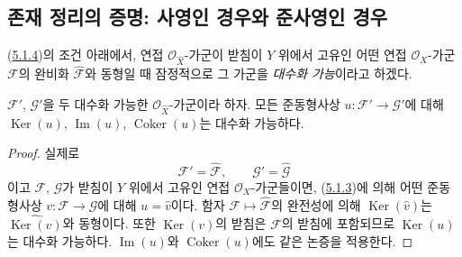 \subsection{존재 정리의 증명: 사영인 경우와 준사영인 경우}
\label{subsection:III.5.2-fr}

\begin{env}[5.2.1]
\label{III.5.2.1-fr}
(\hyperref[III.5.1.4-fr]{5.1.4})의 조건 아래에서, 연접
$\mathcal O_{\widehat X}$-가군이 받침이 $Y$ 위에서 고유인 어떤
연접 $\mathcal O_X$-가군 $\mathcal F$의 완비화
$\widehat{\mathcal F}$와 동형일 때 잠정적으로 그 가군을
\emph{대수화 가능}이라고 하겠다.
\end{env}

\begin{lemma}[5.2.2]
\label{III.5.2.2-fr}
$\mathcal F'$, $\mathcal G'$을 두 대수화 가능한
$\mathcal O_{\widehat X}$-가군이라 하자. 모든 준동형사상
$u:\mathcal F'\to\mathcal G'$에 대해
$\operatorname{Ker}(u)$, $\operatorname{Im}(u)$,
$\operatorname{Coker}(u)$는 대수화 가능하다.
\end{lemma}

\begin{proof}
실제로
\[
\mathcal F'=\widehat{\mathcal F},\qquad
\mathcal G'=\widehat{\mathcal G}
\]
이고 $\mathcal F$, $\mathcal G$가 받침이 $Y$ 위에서 고유인 연접
$\mathcal O_X$-가군들이면, (\hyperref[III.5.1.3-fr]{5.1.3})에
의해 어떤 준동형사상 $v:\mathcal F\to\mathcal G$에 대해
$u=\widehat v$이다. 함자
$\mathcal F\mapsto\widehat{\mathcal F}$의 완전성에 의해
$\operatorname{Ker}(\widehat v)$는
$\widehat{\operatorname{Ker}(v)}$와 동형이다. 또한
$\operatorname{Ker}(v)$의 받침은 $\mathcal F$의 받침에
포함되므로 $\operatorname{Ker}(u)$는 대수화 가능하다.
$\operatorname{Im}(u)$와 $\operatorname{Coker}(u)$에도 같은
논증을 적용한다.
\end{proof}


